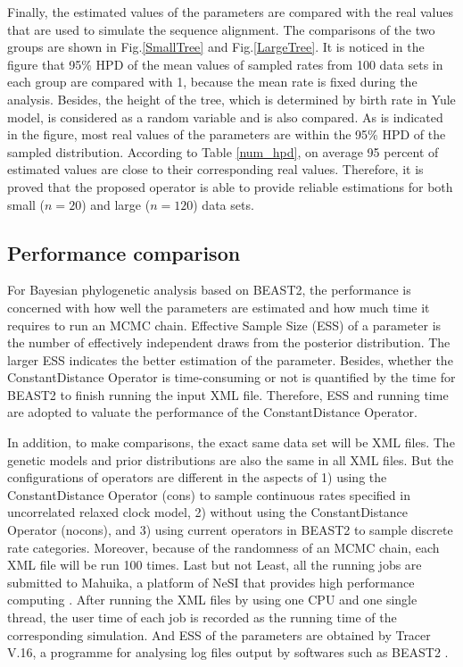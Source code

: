 \documentclass{bmcart}
\begin{document}
Finally, the estimated values of the parameters are compared with the real values that are used to simulate the sequence alignment. The comparisons of the two groups are shown in Fig.\ref{SmallTree} and Fig.\ref{LargeTree}. It is noticed in the figure that 95\% HPD of the mean values of sampled rates from 100 data sets in each group are compared with 1, because the mean rate is fixed during the analysis. Besides, the height of the tree, which is determined by birth rate in Yule model, is considered as a random variable and is also compared. As is indicated in the figure, most real values of the parameters are within the 95\% HPD of the sampled distribution. According to Table \ref{num_hpd}, on average 95 percent of estimated values are close to their corresponding real values. Therefore, it is proved that the proposed operator is able to provide reliable estimations for both small ($n=20$) and large ($n=120$) data sets.
\subsection*{Performance comparison}
For Bayesian phylogenetic analysis based on BEAST2, the performance is concerned with how well the parameters are estimated and how much time it requires to run an MCMC chain. Effective Sample Size (ESS) of a parameter is the number of effectively independent draws from the posterior distribution. The larger ESS indicates the better estimation of the parameter.  Besides, whether the ConstantDistance Operator is time-consuming or not is quantified by the time for BEAST2 to finish running the input XML file. Therefore, ESS and running time are adopted to valuate the performance of the ConstantDistance Operator. 

In addition, to make comparisons, the exact same data set will be XML files. The genetic models and prior distributions are also the same in all XML files. But the configurations of operators are different in the aspects of 1) using the ConstantDistance Operator (cons) to sample continuous rates specified in uncorrelated relaxed clock model, 2) without using the ConstantDistance Operator (nocons), and 3) using current operators in BEAST2 to sample discrete rate categories. Moreover, because of the randomness of an MCMC chain, each XML file will be run 100 times. Last but not Least, all the running jobs are submitted to Mahuika, a platform of NeSI that provides high performance computing \cite{nesi}.  After running the XML files by using one CPU and one single thread, the user time of each job is recorded as the running time of the corresponding simulation. And ESS of the parameters are obtained by Tracer V.16, a programme for analysing log files output by softwares such as BEAST2 \cite{Tracer}.
\end{document}
